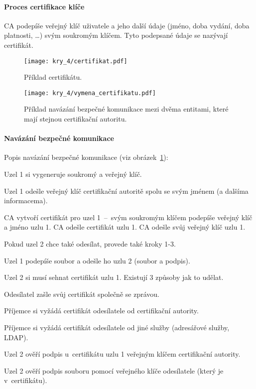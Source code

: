 \paragraph*{Proces certifikace klíče} CA podepíše veřejný klíč uživatele a jeho další údaje (jméno, doba vydání, doba platnosti, \dots) svým soukromým klíčem. Tyto podepsané údaje se nazývají certifikát.

\begin{figure}[H]
    \centering
    \texttt{[image: kry\_4/certifikat.pdf]}
    \caption{Příklad certifikátu.}
\end{figure}

\begin{figure}[H]
    \centering
    \texttt{[image: kry\_4/vymena\_certifikatu.pdf]}
    \caption{Příklad navázání bezpečné komunikace mezi dvěma entitami, které mají stejnou certifikační autoritu.}
    \label{53_vymena_certifikatu}
\end{figure}

\paragraph*{Navázání bezpečné komunikace} Popis navázání bezpečné komunikace (viz obrázek~\ref{53_vymena_certifikatu}):
\begin{compactenum}
    \item Uzel 1 si vygeneruje soukromý a veřejný klíč.

    \item Uzel 1 odešle veřejný klíč certifikační autoritě spolu se svým jménem (a dalšíma informacema).

    \item CA vytvoří certifikát pro uzel 1~--~svým soukromým klíčem podepíše veřejný klíč a jméno uzlu 1. CA odešle certifikát uzlu 1. CA odešle svůj veřejný klíč uzlu 1.

    \item Pokud uzel 2 chce také odesílat, provede také kroky 1-3.

    \item Uzel 1 podepíše soubor a odešle ho uzlu 2 (soubor a podpis).

    \item Uzel 2 si musí sehnat certifikát uzlu 1. Existují 3 způsoby jak to udělat. \begin{compactitem}
        \item Odesílatel zašle svůj certifikát společně se zprávou.
        \item Příjemce si vyžádá certifikát odesílatele od certifikační autority.
        \item Příjemce si vyžádá certifikát odesílatele od jiné služby (adresářové služby, LDAP).
    \end{compactitem}

    \item Uzel 2 ověří podpis u~certifikátu uzlu 1 veřejným klíčem certifikační autority.

    \item Uzel 2 ověří podpis souboru pomocí veřejného klíče odesílatele (který je v~certifikátu).
\end{compactenum}


